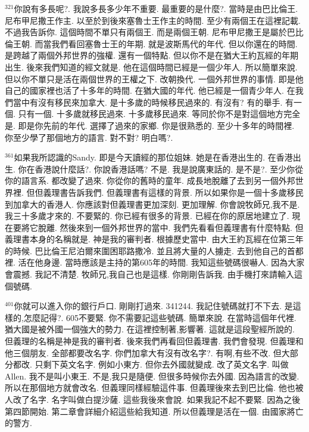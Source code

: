 \documentclass{book}
\begin{document}
$^{321}$你說有多長呢?.
我說多長多少年不重要.
最重要的是什麼?.
當時是由巴比倫王.
尼布甲尼撒王作主.
以至於到後來塞魯士王作主的時間.
至少有兩個王在這裡記載.
不過我告訴你.
這個時間不單只有兩個王.
而是兩個王朝.
尼布甲尼撒王是屬於巴比倫王朝.
而當我們看回塞魯士王的年期.
就是波斯馬代的年代.
但以你還在的時間.
是跨越了兩個外邦世界的強權.
還有一個特點.
但以你不是在猶大王約瓦經的年期出生.
後來我們知道的經文就是.
他在這個時間已經是一個少年人.
所以簡單來說.
但以你不單只是活在兩個世界的王權之下.
改朝換代.
一個外邦世界的事情.
即是他自己的國家裡也活了十多年的時間.
在猶大國的年代.
他已經是一個青少年人.
在我們當中有沒有移民來加拿大.
是十多歲的時候移民過來的.
有沒有? 有的舉手.
有一個.
只有一個.
十多歲就移民過來.
十多歲移民過來.
等同於你不是對這個地方完全是.
即是你先前的年代.
選擇了過來的家鄉.
你是很熟悉的.
至少十多年的時間裡.
你至少學了那個地方的語言.
對不對? 明白嗎?.

$^{361}$如果我所認識的Sandy.
即是今天讀經的那位姐妹.
她是在香港出生的.
在香港出生.
你在香港說什麼話?.
你說香港話嗎? 不是.
我是說廣東話的.
是不是?.
至少你從你的語言系.
都改變了過來.
你從你的舊時的童年.
成長地脫離了去到另一個外邦世界裡.
但但義理書告訴我們.
但義理書有這樣的背景.
所以如果你是一個十多歲移民到加拿大的香港人.
你應該對但義理書更加深刻.
更加理解.
你會說牧師兄,我不是.
我三十多歲才來的.
不要緊的.
你已經有很多的背景.
已經在你的原居地建立了.
現在要將它脫離.
然後來到一個外邦世界的當中.
我們先看看但義理書有什麼特點.
但義理書本身的名稱就是.
神是我的審判者.
根據歷史當中.
由大王約瓦經在位第三年的時候.
巴比倫王尼泊爾來圍困耶路撒冷.
並且將大量的人擄走.
去到他自己的首都裡.
活在他身邊.
當時應該是主持的第605年的時間.
我知這些號碼很嚇人.
因為大家會震撼.
我記不清楚.
牧師兄,我自己也是這樣.
你剛剛告訴我.
由手機打來請輸入這個號碼.

$^{401}$你就可以進入你的銀行戶口.
剛剛打過來.
341244.
我記住號碼就打不下去.
是這樣的,怎麼記得?.
605不要緊.
你不需要記這些號碼.
簡單來說.
在當時這個年代裡.
猶大國是被外國一個強大的勢力.
在這裡控制著,影響著.
這就是這段聖經所說的.
但義理的名稱是神是我的審判者.
後來我們再看回但義理書.
我們會發現.
但義理和他三個朋友.
全部都要改名字.
你們加拿大有沒有改名字?.
有啊,有些不改.
但大部分都改.
只剩下英文名字.
例如小東方.
但你去外國就變成.
改了英文名字.
叫做Allen.
我不是叫小東王.
不是,我只是隨便.
但很多時候你去外國.
因為語言的改變.
所以在那個地方就會改名.
但義理同樣經驗這件事.
但義理後來去到巴比倫.
他也被人改了名字.
名字叫做白提沙薩.
這些我後來會說.
如果我記不起不要緊.
因為之後第四節開始.
第二章會詳細介紹這些給我知道.
所以但義理是活在一個.
由國家將亡的警方.
\end{document}
